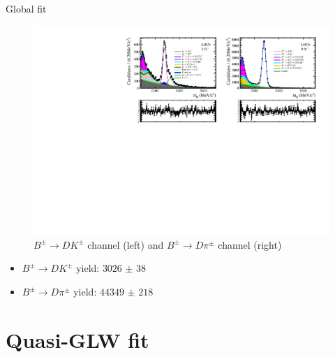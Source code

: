 \documentclass{beamer}
\begin{document}
\begin{frame}{Global fit}
  \begin{figure}
    \centering
    \includegraphics[width = 1.0\textwidth]{Plots/d2kkpipi_fiveL_allDP.pdf}
    \caption{$B^\pm\to DK^\pm$ channel (left) and $B^\pm\to D\pi^\pm$ channel (right)}
  \end{figure}
  \vspace{-0.5cm}
  \begin{itemize}
    \item{$B^\pm\to DK^\pm$ yield: $\SI{3026(38)}{}$}
    \item{$B^\pm\to D\pi^\pm$ yield: $\SI{44349(218)}{}$}
  \end{itemize}
\end{frame}

\section{Quasi-GLW fit}
\end{document}
